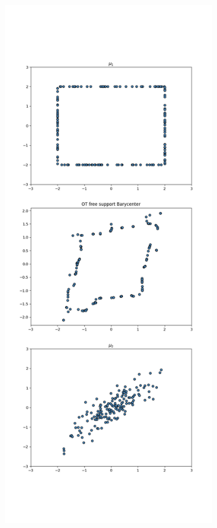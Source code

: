 \documentclass[a4paper, 11pt]{article}
\begin{document}
\begin{figure}
    \begin{subfigure}{0.5\textwidth}
        \centering
        \includegraphics[width=\textwidth]{figures/ot_barycenter_reg0.05.png}

\end{subfigure}
\end{figure}
\end{document}
